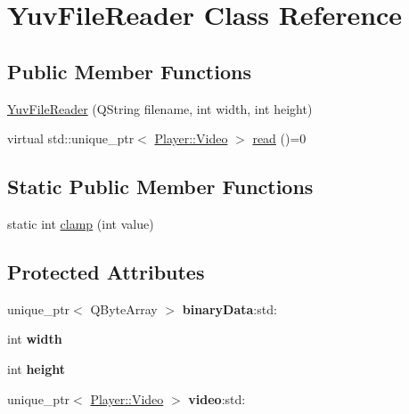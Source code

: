 \hypertarget{classPlayer_1_1YuvFileReader}{}\section{Yuv\+File\+Reader Class Reference}
\label{classPlayer_1_1YuvFileReader}
\subsection*{Public Member Functions}
\begin{DoxyCompactItemize}
\item 
\hyperlink{classPlayer_1_1YuvFileReader_a4d1117a96eef85d154a837df5779e21a}{Yuv\+File\+Reader} (Q\+String filename, int width, int height)
\item 
virtual std\+::unique\+\_\+ptr$<$ \hyperlink{classPlayer_1_1Video}{Player\+::\+Video} $>$ \hyperlink{classPlayer_1_1YuvFileReader_a459f344a5e83a00d0a84d8bde70f5372}{read} ()=0
\end{DoxyCompactItemize}
\subsection*{Static Public Member Functions}
\begin{DoxyCompactItemize}
\item 
static int \hyperlink{classPlayer_1_1YuvFileReader_ae73346d00388350396fd2185ca80dfb8}{clamp} (int value)
\end{DoxyCompactItemize}
\subsection*{Protected Attributes}
\begin{DoxyCompactItemize}
\item 
\hypertarget{classPlayer_1_1YuvFileReader_aa6f0d985e2603aa538ffa615b26c0b4d}{}unique\+\_\+ptr$<$ Q\+Byte\+Array $>$ {\bfseries binary\+Data}\+:std\+:\label{classPlayer_1_1YuvFileReader_aa6f0d985e2603aa538ffa615b26c0b4d}

\item 
\hypertarget{classPlayer_1_1YuvFileReader_a2474a5474cbff19523a51eb1de01cda4}{}int {\bfseries width}\label{classPlayer_1_1YuvFileReader_a2474a5474cbff19523a51eb1de01cda4}

\item 
\hypertarget{classPlayer_1_1YuvFileReader_ad12fc34ce789bce6c8a05d8a17138534}{}int {\bfseries height}\label{classPlayer_1_1YuvFileReader_ad12fc34ce789bce6c8a05d8a17138534}

\item 
\hypertarget{classPlayer_1_1YuvFileReader_a1ca96297b40d3b18f639256db1593e8b}{}unique\+\_\+ptr$<$ \hyperlink{classPlayer_1_1Video}{Player\+::\+Video} $>$ {\bfseries video}\+:std\+:\label{classPlayer_1_1YuvFileReader_a1ca96297b40d3b18f639256db1593e8b}

\end{DoxyCompactItemize}


